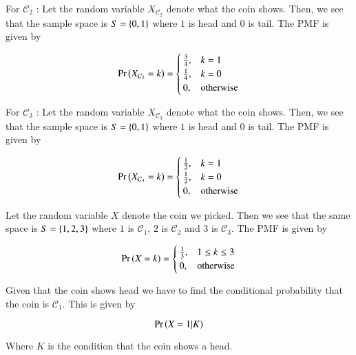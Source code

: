\documentclass[journal,12pt,twocolumn]{IEEEtran}
\begin{document}
\noindent For $\mathcal{C}_2$ :
\newline Let the random variable $X_{\mathcal{C}_2}$ denote what the coin shows. Then, we see that the sample space is $S = \left\{0, 1\right\}$ where $1$ is head and $0$ is tail. The PMF is given by

\begin{equation}
\Pr\left(X_{\mathcal{C}_2} = k\right) = 
\begin{cases}
\frac{3}{4}, & k = 1 \\
\frac{1}{4}, & k = 0 \\
0, & \text{otherwise}
\end{cases}
\label{pmf}
\end{equation}


\noindent For $\mathcal{C}_3$ :
\newline Let the random variable $X_{\mathcal{C}_3}$ denote what the coin shows. Then, we see that the sample space is $S = \left\{0, 1\right\}$ where $1$ is head and $0$ is tail. The PMF is given by

\begin{equation}
\Pr\left(X_{\mathcal{C}_3} = k\right) = 
\begin{cases}
\frac{1}{2}, & k = 1 \\
\frac{1}{2}, & k = 0 \\
0, & \text{otherwise}
\end{cases}
\label{pmf}
\end{equation}

 \noindent Let the random variable $X$ denote the coin we picked. Then we see that the same space is $S = \left\{1,2,3\right\}$ where $1$ is $\mathcal{C}_1$, $2$ is $\mathcal{C}_2$ and $3$ is $\mathcal{C}_3$. The PMF is given by
 
\begin{equation}
\Pr\left(X = k\right) = 
\begin{cases}
\frac{1}{3}, & 1 \leq k \leq 3 \\
0, & \text{otherwise}
\end{cases}
\label{pmf}
\end{equation}

\noindent Given that the coin shows head we have to find the conditional probability that the coin is $\mathcal{C}_1$. This is given by

\begin{equation}
    \Pr\left(X = 1 | K\right)
\end{equation}

\noindent Where $K$ is the condition that the coin shows a head.\newline 
\end{document}
